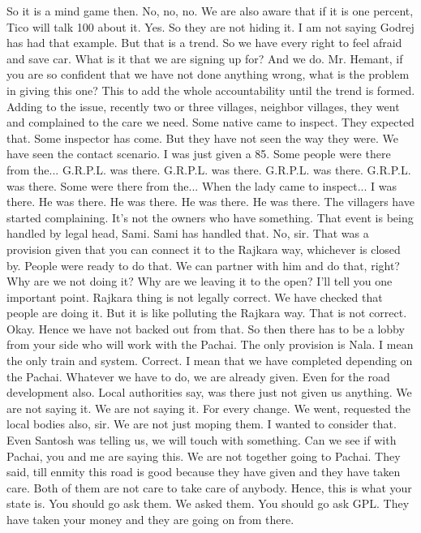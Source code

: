 So it is a mind game then.
No, no, no.
We are also aware that if it is one percent, Tico will talk 100 about it.
Yes.
So they are not hiding it.
I am not saying Godrej has had that example.
But that is a trend.
So we have every right to feel afraid and save car.
What is it that we are signing up for?
And we do.
Mr. Hemant, if you are so confident that we have not done anything wrong,
what is the problem in giving this one?
This to add the whole accountability until the trend is formed.
Adding to the issue, recently two or three villages, neighbor villages,
they went and complained to the care we need.
Some native came to inspect.
They expected that.
Some inspector has come.
But they have not seen the way they were.
We have seen the contact scenario.
I was just given a 85.
Some people were there from the...
G.R.P.L. was there.
G.R.P.L. was there.
G.R.P.L. was there.
G.R.P.L. was there.
Some were there from the...
When the lady came to inspect...
I was there.
He was there.
He was there.
He was there.
He was there.
The villagers have started complaining.
It's not the owners who have something.
That event is being handled by legal head, Sami.
Sami has handled that.
No, sir.
That was a provision given that you can connect it to the Rajkara way,
whichever is closed by.
People were ready to do that.
We can partner with him and do that, right?
Why are we not doing it?
Why are we leaving it to the open?
I'll tell you one important point.
Rajkara thing is not legally correct.
We have checked that people are doing it.
But it is like polluting the Rajkara way.
That is not correct.
Okay.
Hence we have not backed out from that.
So then there has to be a lobby from your side
who will work with the Pachai.
The only provision is Nala.
I mean the only train and system.
Correct.
I mean that we have completed depending on the Pachai.
Whatever we have to do, we are already given.
Even for the road development also.
Local authorities say,
was there just not given us anything.
We are not saying it.
We are not saying it.
For every change.
We went, requested the local bodies also, sir.
We are not just moping them.
I wanted to consider that.
Even Santosh was telling us, we will touch with something.
Can we see if with Pachai, you and me are saying this.
We are not together going to Pachai.
They said, till enmity this road is good
because they have given and they have taken care.
Both of them are not care to take care of anybody.
Hence, this is what your state is.
You should go ask them.
We asked them.
You should go ask GPL.
They have taken your money and they are going on from there.
